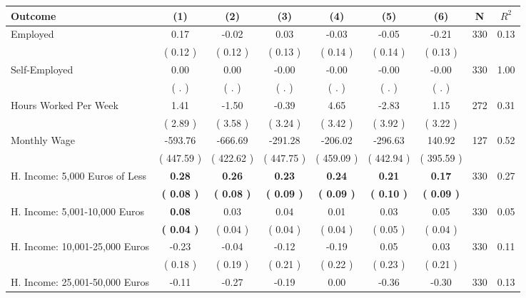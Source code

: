 \begin{tabular}{lcccccccc}
\toprule
 \textbf{Outcome} & \textbf{(1)} & \textbf{(2)} & \textbf{(3)} & \textbf{(4)} & \textbf{(5)} & \textbf{(6)} & \textbf{N} & \textbf{$ R^2$} \\
\midrule
Employed &      0.17 &     -0.02 &      0.03 &     -0.03 &     -0.05 &     -0.21 & 330 &       0.13 \\ 
 & (     0.12 ) & (     0.12 ) & (     0.13 ) & (     0.14 ) & (     0.14 ) & (     0.13 ) & \\
Self-Employed &      0.00 &      0.00 &     -0.00 &     -0.00 &     -0.00 &     -0.00 & 330 &       1.00 \\ 
 & (        . ) & (        . ) & (        . ) & (        . ) & (        . ) & (        . ) & \\
Hours Worked Per Week &      1.41 &     -1.50 &     -0.39 &      4.65 &     -2.83 &      1.15 & 272 &       0.31 \\ 
 & (     2.89 ) & (     3.58 ) & (     3.24 ) & (     3.42 ) & (     3.92 ) & (     3.22 ) & \\
Monthly Wage &   -593.76 &   -666.69 &   -291.28 &   -206.02 &   -296.63 &    140.92 & 127 &       0.52 \\ 
 & (   447.59 ) & (   422.62 ) & (   447.75 ) & (   459.09 ) & (   442.94 ) & (   395.59 ) & \\
H. Income: 5,000 Euros of Less & \textbf{     0.28} & \textbf{     0.26} & \textbf{     0.23} & \textbf{     0.24} & \textbf{     0.21} & \textbf{     0.17} & 330 &       0.27 \\ 
 & \textbf{(     0.08 )} & \textbf{(     0.08 )} & \textbf{(     0.09 )} & \textbf{(     0.09 )} & \textbf{(     0.10 )} & \textbf{(     0.09 )} & \\
H. Income: 5,001-10,000 Euros & \textbf{     0.08} &      0.03 &      0.04 &      0.01 &      0.03 &      0.05 & 330 &       0.05 \\ 
 & \textbf{(     0.04 )} & (     0.04 ) & (     0.04 ) & (     0.04 ) & (     0.05 ) & (     0.04 ) & \\
H. Income: 10,001-25,000 Euros &     -0.23 &     -0.04 &     -0.12 &     -0.19 &      0.05 &      0.03 & 330 &       0.11 \\ 
 & (     0.18 ) & (     0.19 ) & (     0.21 ) & (     0.22 ) & (     0.23 ) & (     0.21 ) & \\
H. Income: 25,001-50,000 Euros &     -0.11 &     -0.27 &     -0.19 &      0.00 &     -0.36 &     -0.30 & 330 &       0.13 \\ 

\end{tabular}
